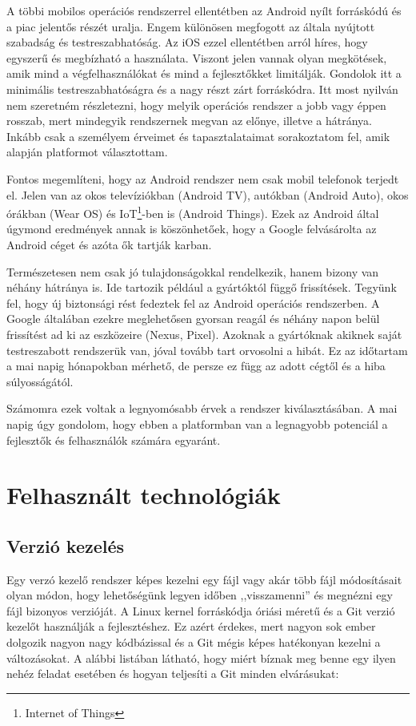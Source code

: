 \documentclass{thesis-ekf}
\theoremstyle{definition}
\theoremstyle{remark}
\begin{document}
A többi mobilos operációs rendszerrel ellentétben az Android nyílt forráskódú és a piac jelentős részét uralja.
Engem különösen megfogott az általa nyújtott szabadság és testreszabhatóság.
Az iOS ezzel ellentétben arról híres, hogy egyszerű és megbízható a használata.
Viszont jelen vannak olyan megkötések, amik mind a végfelhasználókat és mind a fejlesztőkket limitálják.
Gondolok itt a minimális testreszabhatóságra és a nagy részt zárt forráskódra.
Itt most nyilván nem szeretném részletezni, hogy melyik operációs rendszer a jobb vagy éppen rosszab, mert mindegyik rendszernek megvan az előnye, illetve a hátránya.
Inkább csak a személyem érveimet és tapasztalataimat sorakoztatom fel, amik alapján platformot választottam.


Fontos megemlíteni, hogy az Android rendszer nem csak mobil telefonok terjedt el.
Jelen van az okos televíziókban (Android TV), autókban (Android Auto), okos órákban (Wear OS) és IoT\footnote{Internet of Things}-ben is (Android Things).
Ezek az Android által úgymond eredmények annak is köszönhetőek, hogy a Google felvásárolta az Android céget és azóta ők tartják karban.

Természetesen nem csak jó tulajdonságokkal rendelkezik, hanem bizony van néhány hátránya is.
Ide tartozik például a gyártóktól függő frissítések. Tegyünk fel, hogy új biztonsági rést fedeztek fel az Android operációs rendszerben.
A Google általában ezekre meglehetősen gyorsan reagál és néhány napon belül frissítést ad ki az eszközeire (Nexus, Pixel).
Azoknak a gyártóknak akiknek saját testreszabott rendszerük van, jóval tovább tart orvosolni a hibát.
Ez az időtartam a mai napig hónapokban mérhető, de persze ez függ az adott cégtől és a hiba súlyosságától. 

Számomra ezek voltak a legnyomósabb érvek a rendszer kiválasztásában.
A mai napig úgy gondolom, hogy ebben a platformban van a legnagyobb potenciál a fejlesztők és felhasználók számára egyaránt.

\chapter{Felhasznált technológiák}\label{technologiak}

\section{Verzió kezelés}

Egy verzó kezelő rendszer képes kezelni egy fájl vagy akár több fájl módosításait olyan módon, hogy lehetőségünk legyen időben ,,visszamenni'' és megnézni egy fájl bizonyos verzióját.
A Linux kernel forráskódja óriási méretű és a Git verzió kezelőt használják a fejlesztéshez.
Ez azért érdekes, mert nagyon sok ember dolgozik nagyon nagy kódbázissal és a Git mégis képes hatékonyan kezelni a változásokat.
A alábbi listában látható, hogy miért bíznak meg benne egy ilyen nehéz feladat esetében és hogyan teljesíti a Git minden elvárásukat:
\end{document}
